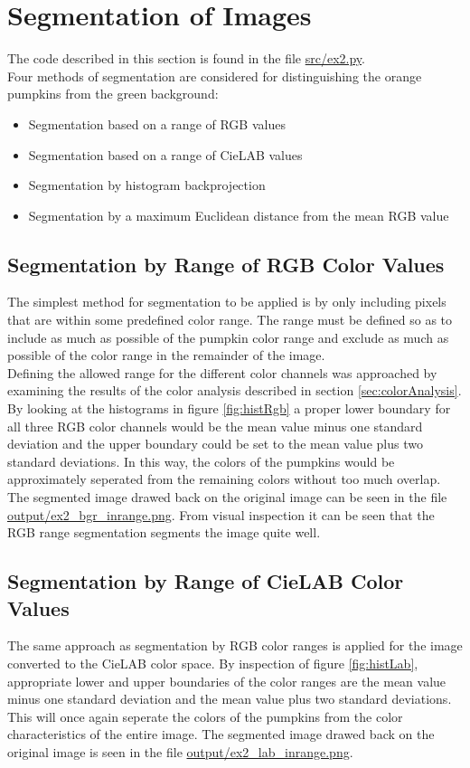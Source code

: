 \documentclass[../Head/Main.tex]{subfiles}
\begin{document}
\section{Segmentation of Images} \label{sec:seg}
The code described in this section is found in the file \url{src/ex2.py}.\\
Four methods of segmentation are considered for distinguishing the orange pumpkins from the green background:
\begin{itemize}
\item Segmentation based on a range of RGB values
\item Segmentation based on a range of CieLAB values
\item Segmentation by histogram backprojection
\item Segmentation by a maximum Euclidean distance from the mean RGB value
\end{itemize}

\subsection{Segmentation by Range of RGB Color Values}
The simplest method for segmentation to be applied is by only including pixels that are within some predefined color range. The range must be defined so as to include as much as possible of the pumpkin color range and exclude as much as possible of the color range in the remainder of the image.\\
Defining the allowed range for the different color channels was approached by examining the results of the color analysis described in section \ref{sec:colorAnalysis}. By looking at the histograms in figure \ref{fig:histRgb} a proper lower boundary for all three RGB color channels would be the mean value minus one standard deviation and the upper boundary could be set to the mean value plus two standard deviations. In this way, the colors of the pumpkins would be approximately seperated from the remaining colors without too much overlap.\\
The segmented image drawed back on the original image can be seen in the file \url{output/ex2_bgr_inrange.png}. From visual inspection it can be seen that the RGB range segmentation segments the image quite well. 

\subsection{Segmentation by Range of CieLAB Color Values}
The same approach as segmentation by RGB color ranges is applied for the image converted to the CieLAB color space. By inspection of figure \ref{fig:histLab}, appropriate lower and upper boundaries of the color ranges are the mean value minus one standard deviation and the mean value plus two standard deviations. This will once again seperate the colors of the pumpkins from the color characteristics of the entire image. The segmented image drawed back on the original image is seen in the file \url{output/ex2_lab_inrange.png}.
\end{document}
